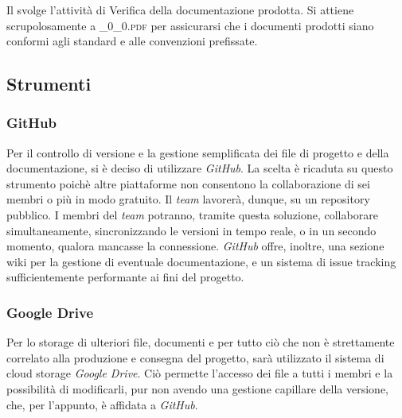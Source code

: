 		\subsubsection{\Ver}
		Il \textit{\Ver} svolge l'attività di Verifica della documentazione prodotta. Si attiene scrupolosamente a \textsc{\_0\_0.pdf} per assicurarsi che i documenti prodotti siano conformi agli standard e alle convenzioni prefissate.

	\subsection{Strumenti}

		\subsubsection{GitHub}
		Per il controllo di versione e la gestione semplificata dei file di progetto e della documentazione, si è deciso di utilizzare \textit{GitHub}. La scelta è ricaduta su questo strumento poichè altre piattaforme non consentono la collaborazione di sei membri o più in modo gratuito. Il \textit{team} lavorerà, dunque, su un repository pubblico. I membri del \textit{team} potranno, tramite questa soluzione, collaborare simultaneamente, sincronizzando le versioni in tempo reale, o in un secondo momento, qualora mancasse la connessione. \textit{GitHub} offre, inoltre, una sezione wiki per la gestione di eventuale documentazione, e un sistema di issue tracking sufficientemente performante ai fini del progetto.

		\subsubsection{Google Drive}
		Per lo storage di ulteriori file, documenti e per tutto ciò che non è strettamente correlato alla produzione e consegna del progetto, sarà utilizzato il sistema di cloud storage \textit{Google Drive}. Ciò permette l'accesso dei file a tutti i membri e la possibilità di modificarli, pur non avendo una gestione capillare della versione, che, per l'appunto, è affidata a \textit{GitHub}.

